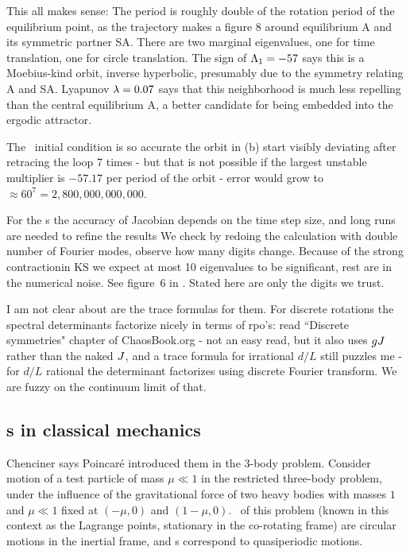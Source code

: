 This all makes sense: The period is roughly double of the rotation period of
the equilibrium point, as the trajectory makes a figure 8 around equilibrium A and
its symmetric partner SA.
 There are two
marginal eigenvalues, one for time translation, one for
circle translation. 
The sign of $\Lambda_{1}=-57$ says this is a Moebius-kind orbit,
inverse hyperbolic, presumably due to the symmetry relating A and SA.
Lyapunov $\lambda=0.07$ says that this neighborhood is much less repelling than
the central equilibrium A, a better candidate for being embedded into the
ergodic attractor.

The \rpo\ initial condition is
so accurate the orbit in (b)
start visibly deviating after retracing the loop 7 times - but that
is not possible if the largest unstable multiplier is 
$-57.17$ per period of the orbit - error would grow to $\approx 60^7
= 2,800,000,000,000$.

For the \rpo s the accuracy of Jacobian depends
on the time step size, and long runs are needed to refine the results
We check by redoing the calculation with double 
number of Fourier modes, observe how many digits
change. 
Because of the strong contractionin KS we expect at most 10 eigenvalues to be
significant, rest are in the numerical noise. See figure~6 in
.
Stated here are only the digits we trust.

I am not clear about are the trace formulas
for them. For discrete rotations the spectral determinants factorize
nicely in terms of rpo's:
read ``Discrete symmetries" chapter of ChaosBook.org - not an easy read, but
it also uses $g{J}$ rather than the naked ${J}$, and a trace formula for irrational
$d/L$ still puzzles me - for $d/L$ rational the determinant factorizes using
discrete Fourier transform.
We are fuzzy on the continuum limit of that.


\subsection{{\Rpo s} in classical mechanics}

Chenciner
says Poincar\'e introduced them in the 3-body problem.
Consider motion of a test particle of mass
$\mu \ll 1$ in the
restricted three-body problem,
under the
influence of the gravitational force of two heavy bodies with masses $1$ and
$\mu \ll 1$ fixed at $(-\mu,0)$ and $(1-\mu,0)$. \Reqv\ of this problem
(known in this context as the Lagrange points, stationary in
the co-rotating frame) are circular motions in the inertial frame,
and {\rpo s} correspond to quasiperiodic motions. 

